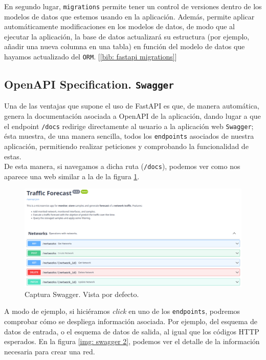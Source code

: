 \documentclass[a4paper, oneside, 12pt]{book}
\begin{document}
	\noindent En segundo lugar, \texttt{migrations} permite tener un control de versiones dentro de los modelos de datos que estemos usando en la aplicación. Además, permite aplicar automáticamente modificaciones en los modelos de datos, de modo que al ejecutar la aplicación, la base de datos actualizará su estructura (por ejemplo, añadir una nueva columna en una tabla) en función del modelo de datos que hayamos actualizado del \texttt{ORM}. [\ref{bib: fastapi migrations}]
	
	\pagebreak
	
	\subsection{OpenAPI Specification. \texttt{Swagger}}
	
	\noindent Una de las ventajas que supone el uso de FastAPI es que, de manera automática, genera la documentación asociada a OpenAPI de la aplicación, dando lugar a que el endpoint \texttt{/docs} redirige directamente al usuario a la aplicación web \texttt{Swagger}; ésta muestra, de una manera sencilla, todos los \texttt{endpoints} asociados de nuestra aplicación, permitiendo realizar peticiones y comprobando la funcionalidad de estas. \\
	
	\noindent De esta manera, si navegamos a dicha ruta (\texttt{/docs}), podemos ver como nos aparece una web similar a la de la figura \ref{img: swagger 1}.
	
	\begin{figure}[h!]
		\includegraphics[width=1.2\textwidth,center]{img/swagger_1.png}
		\caption{Captura Swagger. Vista por defecto.}
		\label{img: swagger 1}
	\end{figure}

	\noindent A modo de ejemplo, si hiciéramos \textit{click} en uno de los \texttt{endpoints}, podremos comprobar cómo se despliega información asociada. Por ejemplo, del esquema de datos de entrada, o el esquema de datos de salida, al igual que los códigos HTTP esperados. En la figura \ref{img: swagger 2}, podemos ver el detalle de la información necesaria para crear una red. \\
	
\end{document}
